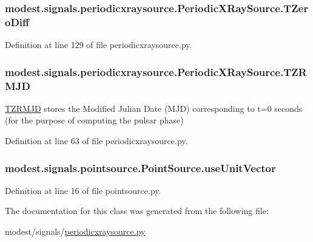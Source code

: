 \subsubsection[{\texorpdfstring{T\+Zero\+Diff}{TZeroDiff}}]{\setlength{\rightskip}{0pt plus 5cm}modest.\+signals.\+periodicxraysource.\+Periodic\+X\+Ray\+Source.\+T\+Zero\+Diff}\hypertarget{classmodest_1_1signals_1_1periodicxraysource_1_1PeriodicXRaySource_ac8781ace6f2f18d79a5114a0ce6224cc}{}\label{classmodest_1_1signals_1_1periodicxraysource_1_1PeriodicXRaySource_ac8781ace6f2f18d79a5114a0ce6224cc}


Definition at line 129 of file periodicxraysource.\+py.

\subsubsection[{\texorpdfstring{T\+Z\+R\+M\+JD}{TZRMJD}}]{\setlength{\rightskip}{0pt plus 5cm}modest.\+signals.\+periodicxraysource.\+Periodic\+X\+Ray\+Source.\+T\+Z\+R\+M\+JD}\hypertarget{classmodest_1_1signals_1_1periodicxraysource_1_1PeriodicXRaySource_a623878bc6ceaa59a60e0f3942768ba5c}{}\label{classmodest_1_1signals_1_1periodicxraysource_1_1PeriodicXRaySource_a623878bc6ceaa59a60e0f3942768ba5c}


\hyperlink{classmodest_1_1signals_1_1periodicxraysource_1_1PeriodicXRaySource_a623878bc6ceaa59a60e0f3942768ba5c}{T\+Z\+R\+M\+JD} stores the Modified Julian Date (M\+JD) corresponding to t=0 seconds (for the purpose of computing the pulsar phase) 



Definition at line 63 of file periodicxraysource.\+py.

\subsubsection[{\texorpdfstring{use\+Unit\+Vector}{useUnitVector}}]{\setlength{\rightskip}{0pt plus 5cm}modest.\+signals.\+pointsource.\+Point\+Source.\+use\+Unit\+Vector\hspace{0.3cm}{\ttfamily [inherited]}}\hypertarget{classmodest_1_1signals_1_1pointsource_1_1PointSource_ac2dd52c4e1f7e6264c9d59a5ffbc43d1}{}\label{classmodest_1_1signals_1_1pointsource_1_1PointSource_ac2dd52c4e1f7e6264c9d59a5ffbc43d1}


Definition at line 16 of file pointsource.\+py.



The documentation for this class was generated from the following file\+:\begin{DoxyCompactItemize}
\item 
modest/signals/\hyperlink{periodicxraysource_8py}{periodicxraysource.\+py}\end{DoxyCompactItemize}
